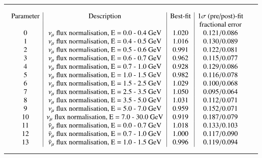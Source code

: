 {\begin{longtable}{p{1.65cm}l}
{    Flux and cross-section parameters tuned by BANFF group on ND280 data \cite{BANFF2013}. 
    Twenty-three correlated parameters are included (i=0,...,22).\\
    $$     
        {
         \renewcommand{\arraystretch}{1.0} %
         \begin{array}{c|c|c|c}
           \text{Parameter} & \text{Description} & \text{Best-fit} & 1\sigma \text{ (pre/post)-fit} \\
           & & & \text{fractional error} \\
            0 &  \nu_\mu \text{ flux normalisation, E = 0.0 - 0.4 GeV}             & 1.020   &  0.121 / 0.086 \\
            1 &  \nu_\mu \text{ flux normalisation, E = 0.4 - 0.5 GeV}             & 1.016   &  0.130 / 0.089 \\
            2 &  \nu_\mu \text{ flux normalisation, E = 0.5 - 0.6 GeV}             & 0.991   &  0.122 / 0.081 \\
            3 &  \nu_\mu \text{ flux normalisation, E = 0.6 - 0.7 GeV}             & 0.962   &  0.115 / 0.077 \\
            4 &  \nu_\mu \text{ flux normalisation, E = 0.7 - 1.0 GeV}             & 0.928   &  0.129 / 0.086 \\
            5 &  \nu_\mu \text{ flux normalisation, E = 1.0 - 1.5 GeV}             & 0.982   &  0.116 / 0.078 \\
            6 &  \nu_\mu \text{ flux normalisation, E = 1.5 - 2.5 GeV}             & 1.029   &  0.100 / 0.068 \\
            7 &  \nu_\mu \text{ flux normalisation, E = 2.5 - 3.5 GeV}             & 1.050   &  0.095 / 0.064 \\
            8 &  \nu_\mu \text{ flux normalisation, E = 3.5 - 5.0 GeV}             & 1.031   &  0.112 / 0.071 \\
            9 &  \nu_\mu \text{ flux normalisation, E = 5.0 - 7.0 GeV}             & 0.959   &  0.152 / 0.071 \\
           10 &  \nu_\mu \text{ flux normalisation, E = 7.0 - 30.0 GeV}            & 0.919   &  0.187 / 0.079 \\
           11 &  \bar{\nu}_{\mu} \text{ flux normalisation, E = 0.0 - 0.7 GeV}     & 1.018   &  0.133 / 0.103 \\
           12 &  \bar{\nu}_{\mu} \text{ flux normalisation, E = 0.7 - 1.0 GeV}     & 1.000   &  0.117 / 0.090 \\
           13 &  \bar{\nu}_{\mu} \text{ flux normalisation, E = 1.0 - 1.5 GeV}     & 0.996   &  0.119 / 0.094 \\

\end{array}}$$}
\end{longtable}}
